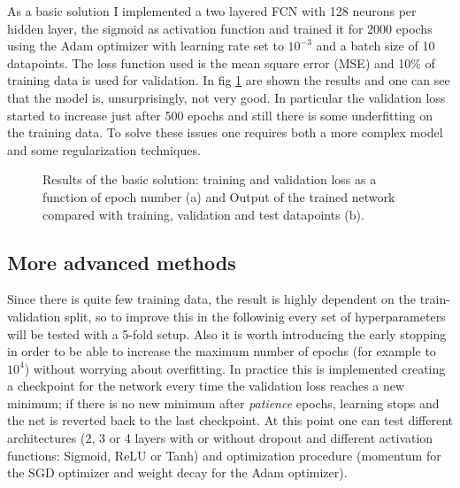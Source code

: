 \documentclass[a4paper, 11pt]{article}
\begin{document}
    As a basic solution I implemented a two layered FCN with 128 neurons per hidden layer, the sigmoid as activation function and trained it for 2000 epochs using the Adam optimizer with learning rate set to $10^{-3}$ and a batch size of 10 datapoints. The loss function used is the mean square error (MSE) and 10\% of training data is used for validation. In fig \ref{fig:r:basic} are shown the results and one can see that the model is, unsurprisingly, not very good. In particular the validation loss started to increase just after 500 epochs and still there is some underfitting on the training data.
    To solve these issues one requires both a more complex model and some regularization techniques.

    \begin{figure}
      \centering
       \quad
      \caption{Results of the basic solution: training and validation loss as a function of epoch number (a) and Output of the trained network compared with training, validation and test datapoints (b).}
      \label{fig:r:basic}
    \end{figure}

  \subsection{More advanced methods}
    Since there is quite few training data, the result is highly dependent on the train-validation split, so to improve this in the followinig every set of hyperparameters will be tested with a 5-fold setup.
    Also it is worth introducing the early stopping in order to be able to increase the maximum number of epochs (for example to $10^4$) without worrying about overfitting. In practice this is implemented creating a checkpoint for the network every time the validation loss reaches a new minimum; if there is no new minimum after \emph{patience} epochs, learning stops and the net is reverted back to the last checkpoint.
    At this point one can test different architectures (2, 3 or 4 layers with or without dropout and different activation functions: Sigmoid, ReLU or Tanh) and optimization procedure (momentum for the SGD optimizer and weight decay for the Adam optimizer).
\end{document}
